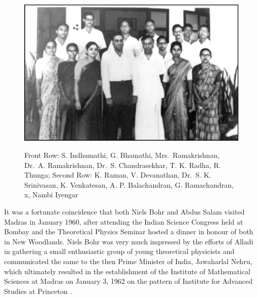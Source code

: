 \begin{figure}[H]
\centering
\includegraphics[scale=.35]{src/images/chap3/chap3-fig3.eps}\\
\caption{Front Row: S. Indhumathi, G. Bhamathi, Mrs.\ Ramakrishnan, Dr.\ A. Ramakrishnan, Dr.\ S. Chandrasekhar, T. K. Radha, R. Thunga;
Second Row: K. Raman, V. Devanathan, Dr.\ S. K. Srinivasan, K. Venkatesan, A. P. Balachandran, G. Ramachandran, x, Nambi Iyengar}
\end{figure}

It was a fortunate coincidence that both Niels Bohr and Abdus Salam visited Madras in January 1960, after attending the Indian Science Congress held at Bombay and the Theoretical Physics Seminar hosted a dinner in honour of both in New Woodlands. Niels Bohr was very much impressed by the efforts of Alladi in gathering a small enthusiastic group of young theoretical physicists and communicated the same to the then Prime Minister of India, Jawaharlal Nehru, which ultimately resulted in the establishment of the Institute of Mathematical Sciences at Madras 	on January 3, 1962 on the pattern of Institute for Advanced Studies at Princeton \cite{chap3-key9}.

